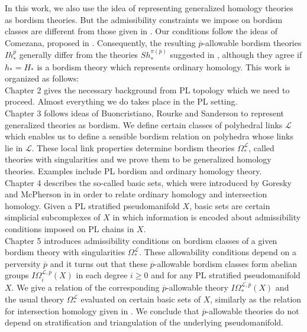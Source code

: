 \documentclass{scrreprt}
\begin{document}
In this work, we also use the idea of representing generalized homology theories as bordism theories. But the admissibility constraints we impose on bordism classes are different from those given in \cite{rourkestratifications}. Our conditions follow the ideas of Comezana, proposed in \cite{comezana}.  Consequently, the resulting $\overline{p}$-allowable bordism theories $Ih_*^{\overline{p}}$ generally differ from the theories $Sh_*^{\pi(\overline{p})}$ suggested in \cite{rourkestratifications}, although they agree if $h_*=H_*$ is a bordism theory which represents ordinary homology. This work is organized as follows: \\
Chapter 2 gives the necessary background from PL topology which we need to proceed. Almost everything we do takes place in the PL setting. \\
Chapter 3 follows ideas of Buoncristiano, Rourke and Sanderson to represent generalized theories as bordism. We define certain classes of polyhedral links $\mathcal{L}$ which enables us to define a sensible bordism relation on polyhedra whose links lie in $\mathcal{L}$. These local link properties determine bordism theories $\Omega_*^{\mathcal{L}}$, called theories with singularities and we prove them to be generalized homology theories. Examples include PL bordism and ordinary homology theory. \\
Chapter 4 describes the so-called basic sets, which were introduced by Goresky and McPherson in \cite{GM} in order to relate ordinary homology and intersection homology. Given a PL stratified pseudomanifold $X$, basic sets are certain simplicial subcomplexes of $X$ in which information is encoded about admissibility conditions imposed on PL chains in $X$. \\
Chapter 5 introduces admissibility conditions on bordism classes of a given bordism theory with singularities $\Omega_*^{\mathcal{L}}$. These allowability conditions depend on a perversity $\overline{p}$ and it turns out that these $\overline{p}$-allowable bordism classes form abelian groups $I\Omega_i^{\mathcal{L}, \overline{p}}(X)$ in each degree $i \geq 0$ and for any PL stratified pseudomanifold $X$. We give a relation of the corresponding $\overline{p}$-allowable theory $I\Omega_*^{\mathcal{L},\overline{p}}(X)$ and the usual theory $\Omega_*^{\mathcal{L}}$ evaluated on certain basic sets of $X$, similarly as the relation for intersection homology given in \cite{GM}. We conclude that $\overline{p}$-allowable theories do not depend on stratification and triangulation of the underlying pseudomanifold. \\
\end{document}
